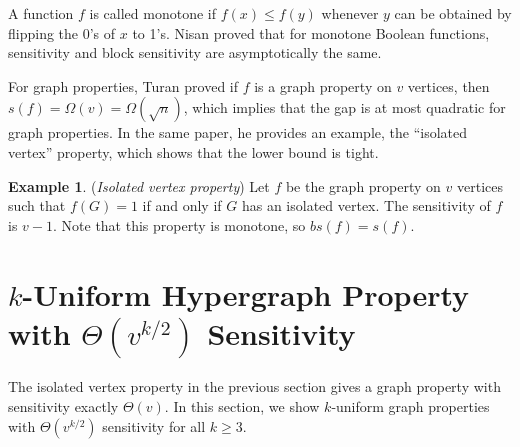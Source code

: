\documentclass[psamsfonts]{amsart}
\theoremstyle{definition}
\newtheorem{exmp}[theorem]{Example}
\theoremstyle{remark}
\numberwithin{equation}{section}
\begin{document}
	A function $f$ is called monotone if $f(x) \leq f(y)$ whenever $y$ can be obtained by flipping the 0's of $x$ to 1's. Nisan \cite{N} proved that for monotone Boolean functions, sensitivity and block sensitivity are asymptotically the same.  

	For graph properties, Turan \cite{T} proved if $f$ is a graph property on $v$ vertices, then $s(f) = \Omega(v) = \Omega(\sqrt{n})$, which implies that the gap is at most quadratic for graph properties. In the same paper, he provides an example, the ``isolated vertex'' property, which shows that the lower bound is tight.

	\begin{exmp} ({\it Isolated vertex property}) 
		Let $f$ be the graph property on $v$ vertices such that $f(G) = 1$ if and only if $G$ has an isolated vertex. The sensitivity of $f$ is $v-1$. Note that this property is monotone, so $bs(f) = s(f)$.
	\end{exmp}
			
\section{$k$-Uniform  Hypergraph Property with $\Theta(v^{k/2})$ Sensitivity}
	The isolated vertex property in the previous section gives a graph property with sensitivity exactly $\Theta(v)$. In this section, we show $k$-uniform graph properties with $\Theta(v^{k/2})$ sensitivity for all $k \geq 3$.
\end{document}
